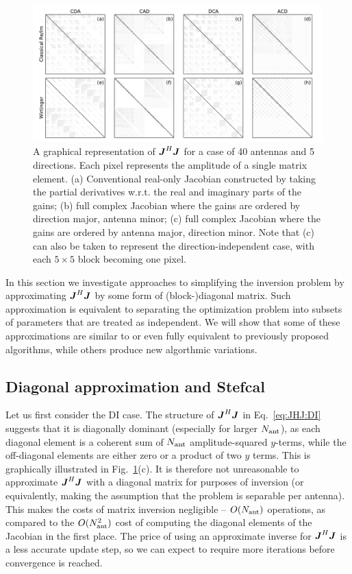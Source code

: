\documentclass[useAMS,usenatbib]{mn2e}
\newcommand{\mat}[1]{{\bmath{#1}}}
\newcommand{\JJ}{\mat{J}} %
\newcommand{\JHJ}{\JJ^H\JJ} %
\begin{document}
\begin{figure}
\begin{center}
\includegraphics[width=\textwidth]{FourOrderJhJ.pdf}
\caption{\label{fig:JHJ}A graphical representation of $\JHJ$ for a case of 
40 antennas and 5 directions. Each pixel represents the amplitude of a single matrix element.
(a) Conventional real-only Jacobian constructed by taking the partial
derivatives w.r.t. the real and imaginary parts of the gains; (b) full complex Jacobian where the gains 
are ordered by direction major, antenna minor; (c) full complex Jacobian where the gains are ordered by 
antenna major, direction minor. Note that (c) can also be taken to represent the direction-independent case, 
with each $5\times5$ block becoming one pixel.}
\end{center}
\end{figure}



In this section we investigate approaches to simplifying the inversion problem by approximating
$\JJ^H\JJ$ by some form of (block-)diagonal matrix. Such approximation is equivalent to separating
the optimization problem into subsets of parameters that are treated as independent. We will show 
that some of these approximations are similar to or even fully equivalent to previously proposed 
algorithms, while others produce new algorthmic variations.

\subsection{Diagonal approximation and Stefcal}
\label{sec:DI:stefcal}

Let us first consider the DI case. The structure of $\JJ^H\JJ$ in Eq.~\ref{eq:JHJ:DI} suggests that it is diagonally 
dominant (especially for larger $N_\mathrm{ant}$), as each diagonal element is a coherent sum of $N_\mathrm{ant}$ amplitude-squared $y$-terms, 
while the off-diagonal elements are either zero or a product of two $y$ terms. This is graphically illustrated in 
Fig.~\ref{fig:JHJ}(c). It is therefore not unreasonable 
to approximate $\JHJ$ with a diagonal matrix for purposes of inversion (or equivalently, making the assumption that 
the problem is separable per antenna). This makes the costs of matrix inversion negligible -- $O(N_\mathrm{ant})$ operations, as 
compared to the $O(N_\mathrm{ant}^2)$ cost 
of computing the diagonal elements of the Jacobian in the first place. The price of using an approximate inverse for 
$\JHJ$ is a less accurate update step, so we can expect to require more iterations before convergence is reached.
\end{document}
